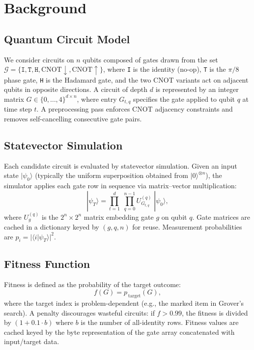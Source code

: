 \documentclass[twocolumn,11pt]{article}
\begin{document}
\section{Background}\label{sec:background}

\subsection{Quantum Circuit Model}

We consider circuits on $n$ qubits composed of gates drawn from the set
$\mathcal{G} = \{\texttt{I}, \texttt{T}, \texttt{H},
\textrm{CNOT}{\downarrow}, \textrm{CNOT}{\uparrow}\}$, where \texttt{I} is the identity (no-op),
\texttt{T} is the $\pi/8$ phase gate, \texttt{H} is the Hadamard gate, and
the two CNOT variants act on adjacent qubits in opposite directions.  A
circuit of depth $d$ is represented by an integer matrix $G \in \{0,\ldots,4\}^{d
\times n}$, where entry $G_{t,q}$ specifies the gate applied to qubit $q$ at
time step $t$.  A preprocessing pass enforces CNOT adjacency constraints and
removes self-cancelling consecutive gate pairs.

\subsection{Statevector Simulation}

Each candidate circuit is evaluated by statevector simulation.  Given an input
state $|\psi_0\rangle$ (typically the uniform superposition obtained from
$|0\rangle^{\otimes n}$), the simulator applies each gate row in sequence via
matrix--vector multiplication:
\begin{equation}
    |\psi_T\rangle = \prod_{t=1}^{d}\;\prod_{q=0}^{n-1} U_{G_{t,q}}^{(q)} \;|\psi_0\rangle,
\end{equation}
where $U_{g}^{(q)}$ is the $2^n \times 2^n$ matrix embedding gate $g$ on qubit
$q$.  Gate matrices are cached in a dictionary keyed by $(g, q, n)$ for
reuse.  Measurement probabilities are $p_i = |\langle i | \psi_T \rangle|^2$.

\subsection{Fitness Function}

Fitness is defined as the probability of the target outcome:
\begin{equation}\label{eq:fitness}
    f(G) = p_{\,\text{target}}(G),
\end{equation}
where the target index is problem-dependent (e.g., the marked item in Grover's
search).  A penalty discourages wasteful circuits: if $f > 0.99$, the fitness
is divided by $(1 + 0.1 \cdot b)$ where $b$ is the number of all-identity
rows.  Fitness values are cached keyed by the byte representation of the gate
array concatenated with input/target data.
\end{document}
